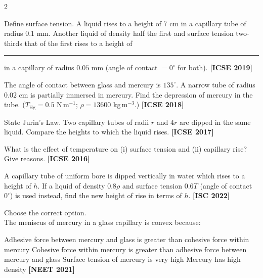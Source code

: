 \documentclass[12pt, a4paper]{exam}
\begin{document}
\begin{multicols}{2}
\begin{questions}

\question Define surface tension. A liquid rises to a height of 7 cm in a capillary tube of radius $0.1$ mm. Another liquid of density half the first and surface tension two-thirds that of the first rises to a height of \rule{1.5cm}{0.15mm} in a capillary of radius $0.05$ mm (angle of contact $= 0^\circ$ for both). \hfill\textbf{[ICSE 2019]}

\vspace{3em}

\question The angle of contact between glass and mercury is $135^\circ$. A narrow tube of radius $0.02$ cm is partially immersed in mercury. Find the depression of mercury in the tube. ($T_{\text{Hg}} = 0.5$ N\,m$^{-1}$; $\rho = 13600$ kg\,m$^{-3}$.) \hfill\textbf{[ICSE 2018]}

\vspace{4em}

\question State Jurin's Law. Two capillary tubes of radii $r$ and $4r$ are dipped in the same liquid. Compare the heights to which the liquid rises. \hfill\textbf{[ICSE 2017]}

\vspace{3em}

\question What is the effect of temperature on (i) surface tension and (ii) capillary rise? Give reasons. \hfill\textbf{[ICSE 2016]}

\vspace{3em}

\question A capillary tube of uniform bore is dipped vertically in water which rises to a height of $h$. If a liquid of density $0.8 \rho$ and surface tension $0.6T$ (angle of contact $0^\circ$) is used instead, find the new height of rise in terms of $h$. \hfill\textbf{[ISC 2022]}

\vspace{3em}

\question Choose the correct option.\\
The meniscus of mercury in a glass capillary is convex because:

\vspace{0.3em}
\begin{choices}
\choice Adhesive force between mercury and glass is greater than cohesive force within mercury
\choice Cohesive force within mercury is greater than adhesive force between mercury and glass
\choice Surface tension of mercury is very high
\choice Mercury has high density \hfill\textbf{[NEET 2021]}
\end{choices}


\end{questions}
\end{multicols}
\end{document}
